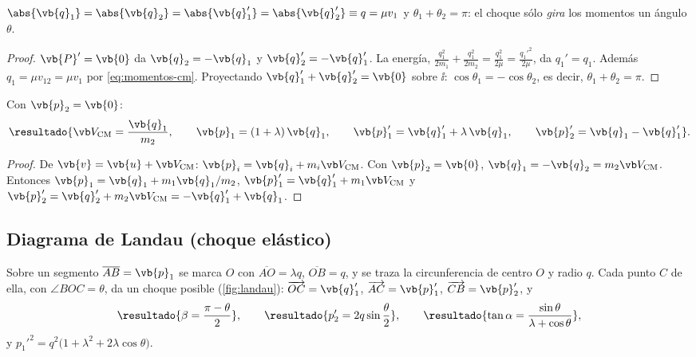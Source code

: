 \begin{proposicion}
\label{prop:elastico-cm}
$\abs{\vb{q}_{1}}=\abs{\vb{q}_{2}}=\abs{\vb{q}_{1}'}=\abs{\vb{q}_{2}'}\equiv q=\mu v_{1}$ y $\theta_{1}+\theta_{2}=\pi$:
el choque sólo \emph{gira} los momentos un ángulo $\theta$.
\end{proposicion}

\begin{proof}
$\vb{P}'=\vb{0}$ da $\vb{q}_{2}=-\vb{q}_{1}$ y $\vb{q}_{2}'=-\vb{q}_{1}'$. La energía,
$\frac{q_{1}^{2}}{2m_{1}}+\frac{q_{1}^{2}}{2m_{2}}=\frac{q_{1}^{2}}{2\mu}=\frac{q_{1}'^{2}}{2\mu}$, da $q_{1}'=q_{1}$.
Además $q_{1}=\mu v_{12}=\mu v_{1}$ por \eqref{eq:momentos-cm}. Proyectando
$\vb{q}_{1}'+\vb{q}_{2}'=\vb{0}$ sobre $\ii$: $\cos\theta_{1}=-\cos\theta_{2}$, es decir, $\theta_{1}+\theta_{2}=\pi$.
\end{proof}

\begin{proposicion}
\label{prop:cambio}
Con $\vb{p}_{2}=\vb{0}$:
\begin{equation}
  \resultado{\Vcm=\frac{\vb{q}_{1}}{m_{2}},\qquad
  \vb{p}_{1}=(1+\lambda)\,\vb{q}_{1},\qquad
  \vb{p}_{1}'=\vb{q}_{1}'+\lambda\,\vb{q}_{1},\qquad
  \vb{p}_{2}'=\vb{q}_{1}-\vb{q}_{1}'} .
  \label{eq:cambio}
\end{equation}
\end{proposicion}

\begin{proof}
De $\vb{v}=\vb{u}+\Vcm$: $\vb{p}_{i}=\vb{q}_{i}+m_{i}\Vcm$. Con $\vb{p}_{2}=\vb{0}$, $\vb{q}_{1}=-\vb{q}_{2}=m_{2}\Vcm$.
Entonces $\vb{p}_{1}=\vb{q}_{1}+m_{1}\vb{q}_{1}/m_{2}$, $\vb{p}_{1}'=\vb{q}_{1}'+m_{1}\Vcm$ y
$\vb{p}_{2}'=\vb{q}_{2}'+m_{2}\Vcm=-\vb{q}_{1}'+\vb{q}_{1}$.
\end{proof}

\subsection{Diagrama de Landau (choque elástico)}

\begin{teorema}
\label{teo:landau}
Sobre un segmento $\overline{AB}=\vb{p}_{1}$ se marca $O$ con $\overline{AO}=\lambda q$,
$\overline{OB}=q$, y se traza la circunferencia de centro $O$ y radio $q$. Cada punto $C$ de
ella, con $\angle BOC=\theta$, da un choque posible (\cref{fig:landau}):
$\overrightarrow{OC}=\vb{q}_{1}'$, $\overrightarrow{AC}=\vb{p}_{1}'$, $\overrightarrow{CB}=\vb{p}_{2}'$, y
\begin{equation}
  \resultado{\beta=\frac{\pi-\theta}{2}},\qquad
  \resultado{p_{2}'=2q\sin\frac\theta2},\qquad
  \resultado{\tan\alpha=\frac{\sin\theta}{\lambda+\cos\theta}},
  \label{eq:landau}
\end{equation}
y $p_{1}'^{2}=q^{2}\bigl(1+\lambda^{2}+2\lambda\cos\theta\bigr)$.
\end{teorema}

